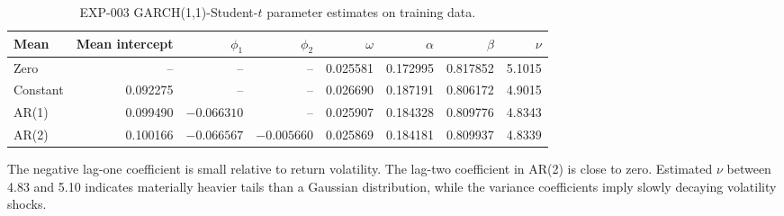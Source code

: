 \documentclass[11pt,a4paper]{article}
\begin{document}
\begin{table}[htbp]
\centering\small
\caption{EXP-003 GARCH(1,1)-Student-$t$ parameter estimates on training data.}
\label{tab:coefficients}
\begin{tabular}{lrrrrrrr}
\toprule
Mean & Mean intercept & $\phi_1$ & $\phi_2$ & $\omega$ & $\alpha$ & $\beta$ & $\nu$\\
\midrule
Zero & -- & -- & -- & 0.025581 & 0.172995 & 0.817852 & 5.1015\\
Constant & 0.092275 & -- & -- & 0.026690 & 0.187191 & 0.806172 & 4.9015\\
AR(1) & 0.099490 & $-0.066310$ & -- & 0.025907 & 0.184328 & 0.809776 & 4.8343\\
AR(2) & 0.100166 & $-0.066567$ & $-0.005660$ & 0.025869 & 0.184181 & 0.809937 & 4.8339\\
\bottomrule
\end{tabular}
\end{table}
The negative lag-one coefficient is small relative to return volatility. The lag-two coefficient
in AR(2) is close to zero. Estimated $\nu$ between 4.83 and 5.10 indicates materially heavier
tails than a Gaussian distribution, while the variance coefficients imply slowly decaying
volatility shocks.
\end{document}
